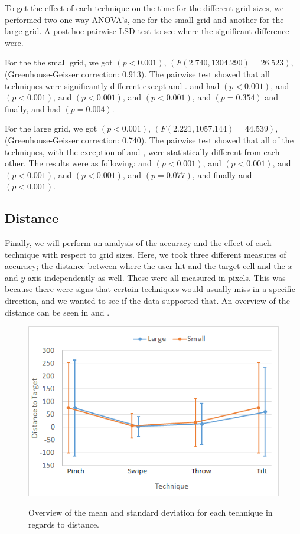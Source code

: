 To get the effect of each technique on the time for the different grid sizes, we performed two one-way ANOVA's, one for the small grid and another for the large grid.
A post-hoc pairwise LSD test to see where the significant difference were.

For the the small grid, we got $(p<0.001)$, $(F(2.740, 1304.290)=26.523)$, (Greenhouse-Geisser correction: 0.913).
The pairwise test showed that all techniques were significantly different except \swipe and \tilt. 
\pinch and \swipe had $(p < 0.001)$, 
\pinch and \throw $(p <0.001)$, 
\pinch and \tilt $(p < 0.001)$, 
\swipe and \throw $(p < 0.001)$, 
\swipe and \tilt $(p = 0.354)$ and finally, 
\throw and \tilt had $(p = 0.004)$. 

For the large grid, we got $(p<0.001)$, $(F(2.221, 1057.144)=44.539)$, (Greenhouse-Geisser correction: 0.740).
The pairwise test showed that all of the techniques, with the exception of \swipe and \tilt, were statistically different from each other. The results were as following: 
\pinch and \swipe $(p<0.001)$, 
\pinch and \throw $(p<0.001)$, 
\pinch and \tilt $(p<0.001)$, 
\swipe and \throw $(p<0.001)$, 
\swipe and \tilt $(p=0.077)$, and finally 
\throw and \tilt $(p<0.001)$.

\subsection{Distance}
Finally, we will perform an analysis of the accuracy and the effect of each technique with respect to grid sizes.
Here, we took three different measures of accuracy; the distance between where the user hit and the target cell and the $x$ and $y$ axis independently as well. 
These were all measured in pixels.
This was because there were signs that certain techniques would usually miss in a specific direction, and we wanted to see if the data supported that. 
An overview of the distance can be seen in  and .

\begin{figure}[H]
	{\includegraphics[width = 1\columnwidth ]{images/distance.png}} 
	\caption{
		Overview of the mean and standard deviation for each technique in regards to distance.
	}
	\label{fig:distanceResults}
\end{figure}

